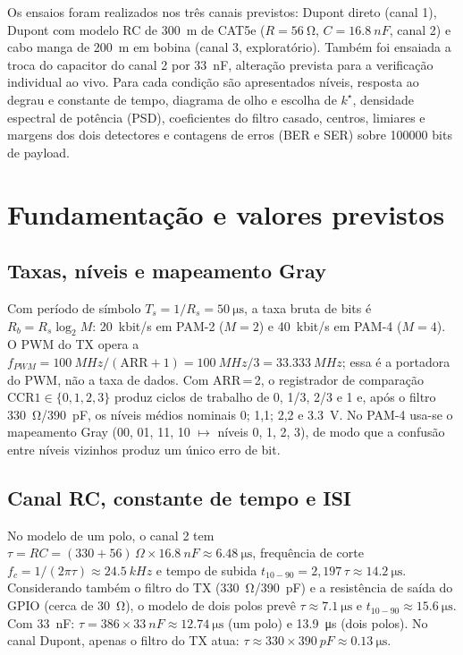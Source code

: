 \documentclass[12pt,a4paper]{article}
\begin{document}
Os ensaios foram realizados nos três canais previstos: Dupont direto (canal 1), Dupont com modelo
RC de \SI{300}{m} de CAT5e ($R=\SI{56}{\ohm}$, $C=\SI{16,8}{nF}$, canal 2) e cabo manga de
\SI{200}{m} em bobina (canal 3, exploratório). Também foi ensaiada a troca do capacitor do canal 2
por \SI{33}{nF}, alteração prevista para a verificação individual ao vivo. Para cada condição são
apresentados níveis, resposta ao degrau e constante de tempo, diagrama de olho e escolha de $k^\star$,
densidade espectral de potência (PSD), coeficientes do filtro casado, centros, limiares e margens dos
dois detectores e contagens de erros (BER e SER) sobre \num{100000} bits de payload.

\section{Fundamentação e valores previstos}

\subsection{Taxas, níveis e mapeamento Gray}

Com período de símbolo $T_s = 1/R_s = \SI{50}{\micro\second}$, a taxa bruta de bits é
$R_b = R_s \log_2 M$: \SI{20}{kbit/s} em PAM-2 ($M=2$) e \SI{40}{kbit/s} em PAM-4 ($M=4$).
O PWM do TX opera a $f_{PWM} = \SI{100}{MHz}/(\text{ARR}+1) = \SI{100}{MHz}/3 = \SI{33,333}{MHz}$;
essa é a portadora do PWM, não a taxa de dados. Com ARR\,=\,2, o registrador de comparação
$\text{CCR1}\in\{0,1,2,3\}$ produz ciclos de trabalho de 0, 1/3, 2/3 e 1 e, após o filtro
\SI{330}{\ohm}/\SI{390}{pF}, os níveis médios nominais 0; 1,1; 2,2 e \SI{3,3}{V}.
No PAM-4 usa-se o mapeamento Gray (00, 01, 11, 10 $\mapsto$ níveis 0, 1, 2, 3), de modo que a
confusão entre níveis vizinhos produz um único erro de bit.

\subsection{Canal RC, constante de tempo e ISI}

No modelo de um polo, o canal 2 tem $\tau = RC = (330+56)\,\Omega \times \SI{16,8}{nF} \approx
\SI{6,48}{\micro\second}$, frequência de corte $f_c = 1/(2\pi\tau) \approx \SI{24,5}{kHz}$ e tempo
de subida $t_{10-90} = 2{,}197\,\tau \approx \SI{14,2}{\micro\second}$. Considerando também o
filtro do TX (\SI{330}{\ohm}/\SI{390}{pF}) e a resistência de saída do GPIO (cerca de
\SI{30}{\ohm}), o modelo de dois polos prevê $\tau \approx \SI{7,1}{\micro\second}$ e
$t_{10-90}\approx\SI{15,6}{\micro\second}$. Com \SI{33}{nF}: $\tau = 386 \times \SI{33}{nF}
\approx \SI{12,74}{\micro\second}$ (um polo) e \SI{13,9}{\micro\second} (dois polos). No canal
Dupont, apenas o filtro do TX atua: $\tau \approx 330\times\SI{390}{pF} \approx \SI{0,13}{\micro\second}$.
\end{document}
